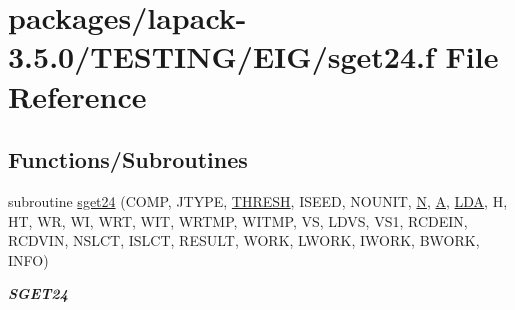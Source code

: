 \hypertarget{sget24_8f}{}\section{packages/lapack-\/3.5.0/\+T\+E\+S\+T\+I\+N\+G/\+E\+I\+G/sget24.f File Reference}
\label{sget24_8f}
\subsection*{Functions/\+Subroutines}
\begin{DoxyCompactItemize}
\item 
subroutine \hyperlink{group__single__eig_ga35b38ff82fbc9f1d0f4e0eba2f7c497f}{sget24} (C\+O\+M\+P, J\+T\+Y\+P\+E, \hyperlink{zlaqgs_8c_a0656018abfc9fa2821827415f5d5ea57}{T\+H\+R\+E\+S\+H}, I\+S\+E\+E\+D, N\+O\+U\+N\+I\+T, \hyperlink{polmisc_8c_a0240ac851181b84ac374872dc5434ee4}{N}, \hyperlink{classA}{A}, \hyperlink{example__user_8c_ae946da542ce0db94dced19b2ecefd1aa}{L\+D\+A}, H, H\+T, W\+R, W\+I, W\+R\+T, W\+I\+T, W\+R\+T\+M\+P, W\+I\+T\+M\+P, V\+S, L\+D\+V\+S, V\+S1, R\+C\+D\+E\+I\+N, R\+C\+D\+V\+I\+N, N\+S\+L\+C\+T, I\+S\+L\+C\+T, R\+E\+S\+U\+L\+T, W\+O\+R\+K, L\+W\+O\+R\+K, I\+W\+O\+R\+K, B\+W\+O\+R\+K, I\+N\+F\+O)
\begin{DoxyCompactList}\small\item\em {\bfseries S\+G\+E\+T24} \end{DoxyCompactList}\end{DoxyCompactItemize}
